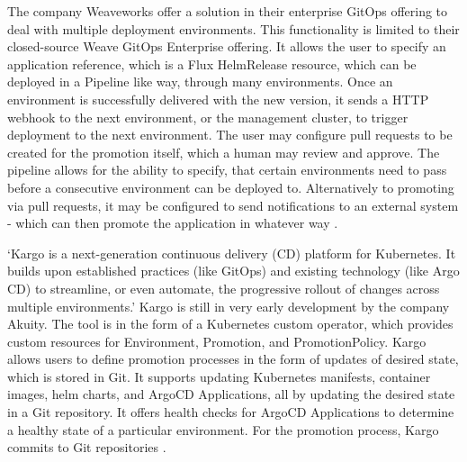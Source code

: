 The company Weaveworks
offer a solution in their enterprise GitOps offering
to deal with multiple deployment environments.
This functionality is limited to their closed-source Weave GitOps Enterprise offering.
It allows the user to specify an application reference,
which is a Flux HelmRelease resource,
which can be deployed in a Pipeline like way,
through many environments.
Once an environment is successfully delivered with the new version,
it sends a HTTP webhook to the next environment, or the management cluster,
to trigger deployment to the next environment.
The user may configure pull requests to be created for the promotion itself,
which a human may review and approve.
The pipeline allows for the ability to specify, that certain environments need
to pass before a consecutive environment can be deployed to.
Alternatively to promoting via pull requests,
it may be configured to send notifications
to an external system -
which can then promote the application in whatever way
\autocite{weaveGitOpsPipelines}.
%


\enquote*{Kargo is a next-generation continuous delivery (CD) platform for Kubernetes. It builds upon established practices (like GitOps) and existing technology (like Argo CD) to streamline, or even automate, the progressive rollout of changes across multiple environments.}
\autocite{kargoAkuityWebsite}
Kargo is still in very early development by the company Akuity.
The tool is in the form of a Kubernetes custom operator, which provides custom resources
for Environment, Promotion, and PromotionPolicy.
Kargo allows users to define promotion processes in the form of updates of desired state,
which is stored in Git. It supports updating Kubernetes manifests, container images, helm charts,
and ArgoCD Applications, all by updating the desired state in a Git repository.
It offers health checks for ArgoCD Applications to determine a healthy state of a particular environment.
For the promotion process, Kargo commits to Git repositories
\autocite{kargoAkuityWebsite}.


